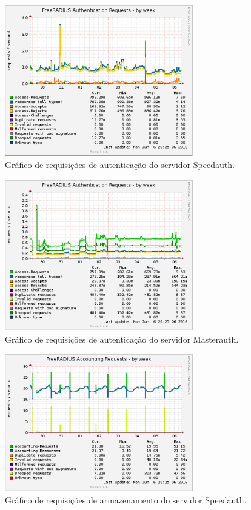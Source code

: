\begin{itemize}
\begin{figure}[h!]
 \centering
 \includegraphics[width=310px]{img/speedauth_auth_week.eps}
 \caption{Gráfico de requisições de autenticação do servidor Speedauth.}
 \label{fig:speedauth_auth_week}
\end{figure}

\begin{figure}[h!]
 \centering
 \includegraphics[width=310px]{img/masterauth_auth_week.eps}
 \caption{Gráfico de requisições de autenticação do servidor Masterauth.}
 \label{fig:masterauth_auth_week}
\end{figure}

\begin{figure}[h!]
 \centering
 \includegraphics[width=310px]{img/speedauth_acct_week.eps}
 \caption{Gráfico de requisições de armazenamento do servidor Speedauth.}
 \label{fig:speedauth_acct_week}
\end{figure}


\end{itemize}

